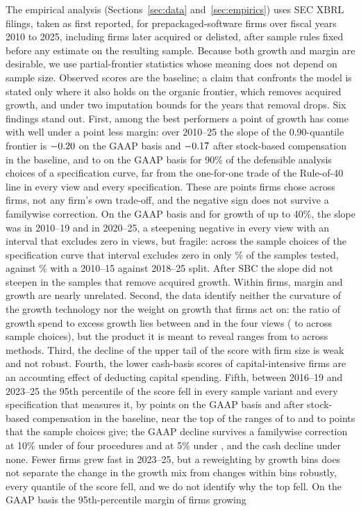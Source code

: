 The empirical analysis (Sections~\ref{sec:data} and~\ref{sec:empirics}) uses SEC XBRL filings, taken as first reported, for \VFirmsEone{} prepackaged-software firms over fiscal years 2010 to 2025, including firms later acquired or delisted, after sample rules fixed before any estimate on the resulting sample. Because both growth and margin are desirable, we use partial-frontier statistics whose meaning does not depend on sample size. Observed scores are the baseline; a claim that confronts the model is stated only where it also holds on the organic frontier, which removes acquired growth, and under two imputation bounds for the years that removal drops. Six findings stand out. First, among the best performers a point of growth has come with well under a point less margin: over 2010--25 the slope of the 0.90-quantile frontier is $-0.20$ on the GAAP basis and $-0.17$ after stock-based compensation in the baseline, and \ScPsiOpPLo{} to \ScPsiOpPHi{} on the GAAP basis for 90\% of the defensible analysis choices of a specification curve, far from the one-for-one trade of the Rule-of-40 line in every view and every specification. These are points firms chose across firms, not any firm's own trade-off, and the negative sign does not survive a familywise correction. On the GAAP basis and for growth of up to 40\%, the slope was \PsiEarlyOp{} in 2010--19 and \PsiLateOp{} in 2020--25, a steepening negative in every view with an interval that excludes zero in \PsiDiffOpCountNeg{} views, but fragile: across the sample choices of the specification curve that interval excludes zero in only \ScDiffOpBootNinetySplitAShare\% of the samples tested, against \ScDiffOpBootNinetySplitBShare\% with a 2010--15 against 2018--25 split. After SBC the slope did not steepen in the samples that remove acquired growth. Within firms, margin and growth are nearly unrelated. Second, the data identify neither the curvature of the growth technology nor the weight on growth that firms act on: the ratio of growth spend to excess growth lies between \SpendLo{} and \SpendHi{} in the four views (\ScSpendMin{} to \ScSpendMax{} across sample choices), but the product it is meant to reveal ranges from \AlphaAllLo{} to \AlphaAllHi{} across methods. Third, the decline of the upper tail of the score with firm size is weak and not robust. Fourth, the lower cash-basis scores of capital-intensive firms are an accounting effect of deducting capital spending. Fifth, between 2016--19 and 2023--25 the 95th percentile of the score fell in every sample variant and every specification that measures it, by \TopFallOpEone{} points on the GAAP basis and \TopFallCashEone{} after stock-based compensation in the baseline, near the top of the ranges of \ScTopOpCoreFallLo{} to \ScTopOpCoreFallHi{} and \ScTopCashCoreFallLo{} to \ScTopCashCoreFallHi{} points that the sample choices give; the GAAP decline survives a familywise correction at 10\% under \TopFamTen{} of four procedures and at 5\% under \TopFamFive, and the cash decline under none. Fewer firms grew fast in 2023--25, but a reweighting by growth bins does not separate the change in the growth mix from changes within bins robustly, every quantile of the score fell, and we do not identify why the top fell. On the GAAP basis the 95th-percentile margin of firms growing 